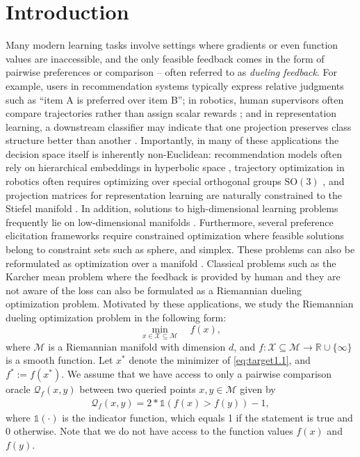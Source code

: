 \documentclass{article}
\theoremstyle{plain}
\theoremstyle{definition}
\theoremstyle{remark}
\begin{document}
\section{Introduction}
Many modern learning tasks involve settings where gradients or even function values are inaccessible, 
and the only feasible feedback comes in the form of pairwise preferences or comparison -- often referred to as \emph{dueling feedback}. 
For example, users in recommendation systems typically express relative judgments such as 
``item A is preferred over item B''; in robotics, human supervisors often compare trajectories rather than assign scalar rewards \citep{yang2025trajectory,jain2013learning}; 
and in representation learning, a downstream classifier may indicate that one projection preserves class structure better than another \citep{ventocilla2020comparative,morariu2021dumbledr}. 
Importantly, in many of these applications the decision space itself is inherently non-Euclidean: recommendation models often rely on hierarchical embeddings in hyperbolic space \citep{chamberlain2019scalable,shimizu2024fashion}, 
trajectory optimization in robotics often requires optimizing over special orthogonal groups $\mathrm{SO}(3)$ \citep{watterson2018trajectory}, and projection matrices for representation learning are naturally constrained to the Stiefel manifold \citep{boumal2023intro}. In addition, solutions to high-dimensional learning problems frequently lie on low-dimensional manifolds \citep{garipov2018loss,hu2022lora}. Furthermore, several preference elicitation frameworks require constrained optimization where feasible solutions belong to constraint sets such as sphere, and simplex. These problems can also be reformulated as optimization over a manifold \citep{boumal2023intro}. Classical problems such as the Karcher mean problem where the feedback is provided by human and they are not aware of the loss can also be formulated as a Riemannian dueling optimization problem. Motivated by these applications, we study the Riemannian dueling optimization problem in the following form:
\begin{equation} 
\min_{x\in\mathcal{X}\subseteq\mathcal{M}} \quad f(x), 
\label{eq:target1.1}
\end{equation}
where $\mathcal{M}$ is a Riemannian manifold with dimension $d$, and $f:\mathcal{X}\subseteq\mathcal{M}\to\mathbb{R}\cup\{\infty\}$ is a smooth function. Let $x^*$ denote the minimizer of \eqref{eq:target1.1}, and $f^* := f(x^*)$. We assume that we have access to only a pairwise comparison oracle $\mathcal{Q}_f(x,y)$ between two queried points $x,y\in\mathcal{M}$ given by 
\begin{align}\label{eq:oracle}
    \mathcal{Q}_f(x,y)=2*\mathbb{1}(f(x)>f(y))-1,
\end{align}
where $\mathbb{1}(\cdot)$ is the indicator function, which equals 1 if the statement is true and 0 otherwise. Note that we do not have access to the function values $f(x)$ and $f(y)$.
\end{document}
